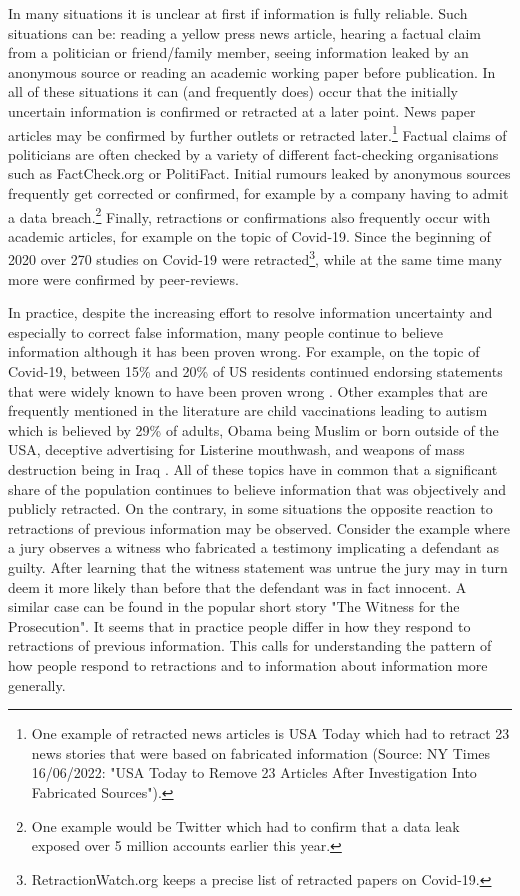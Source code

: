 \documentclass{article}
\begin{document}
In many situations it is unclear at first if information is fully reliable. Such situations can be: reading a yellow press news article, hearing a factual claim from a politician or friend/family member, seeing information leaked by an anonymous source or reading an academic working paper before publication. In all of these situations it can (and frequently does) occur that the initially uncertain information is confirmed or retracted at a later point. News paper articles may be confirmed by further outlets or retracted later.\footnote{One example of retracted news articles is USA Today which had to retract 23 news stories that were based on fabricated information (Source: NY Times 16/06/2022: "USA Today to Remove 23 Articles After Investigation Into Fabricated Sources").} Factual claims of politicians are often checked by a variety of different fact-checking organisations such as FactCheck.org or PolitiFact. Initial rumours leaked by anonymous sources frequently get corrected or confirmed, for example by a company having to admit a data breach.\footnote{One example would be Twitter which had to confirm that a data leak exposed over 5 million accounts earlier this year.} Finally, retractions or confirmations also frequently occur with academic articles, for example on the topic of Covid-19. Since the beginning of 2020 over 270 studies on Covid-19 were retracted\footnote{RetractionWatch.org keeps a precise list of retracted papers on Covid-19.}, while at the same time many more were confirmed by peer-reviews.

In practice, despite the increasing effort to resolve information uncertainty and especially to correct false information, many people continue to believe information although it has been proven wrong. For example, on the topic of Covid-19, between 15\% and 20\% of US residents continued endorsing statements that were widely known to have been proven wrong \citep{Meyer2020}. Other examples that are frequently mentioned in the literature are child vaccinations leading to autism which is believed by 29\% of adults, Obama being Muslim or born outside of the USA, deceptive advertising for Listerine mouthwash, and weapons of mass destruction being in Iraq \citep{Lewandowsky2012}. All of these topics have in common that a significant share of the population continues to believe information that was objectively and publicly retracted. On the contrary, in some situations the opposite reaction to retractions of previous information may be observed. Consider the example where a jury observes a witness who fabricated a testimony implicating a defendant as guilty. After learning that the witness statement was untrue the jury may in turn deem it more likely than before that the defendant was in fact innocent. A similar case can be found in the popular short story "The Witness for the Prosecution". It seems that in practice people differ in how they respond to retractions of previous information. This calls for understanding the pattern of how people respond to retractions and to information about information more generally.
\end{document}

